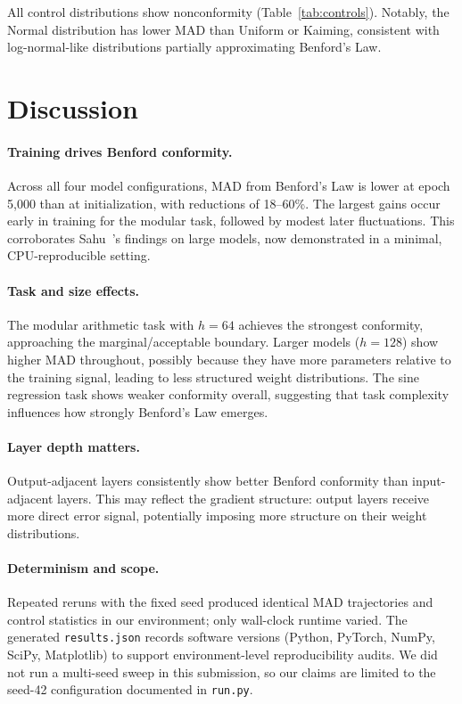 \documentclass[11pt]{article}
\begin{document}
All control distributions show nonconformity (Table~\ref{tab:controls}). Notably, the Normal distribution has lower MAD than Uniform or Kaiming, consistent with log-normal-like distributions partially approximating Benford's Law.

\section{Discussion}

\paragraph{Training drives Benford conformity.}
Across all four model configurations, MAD from Benford's Law is lower at epoch 5{,}000 than at initialization, with reductions of 18--60\%. The largest gains occur early in training for the modular task, followed by modest later fluctuations. This corroborates Sahu~\cite{sahu2021}'s findings on large models, now demonstrated in a minimal, CPU-reproducible setting.

\paragraph{Task and size effects.}
The modular arithmetic task with $h=64$ achieves the strongest conformity, approaching the marginal/acceptable boundary. Larger models ($h=128$) show higher MAD throughout, possibly because they have more parameters relative to the training signal, leading to less structured weight distributions. The sine regression task shows weaker conformity overall, suggesting that task complexity influences how strongly Benford's Law emerges.

\paragraph{Layer depth matters.}
Output-adjacent layers consistently show better Benford conformity than input-adjacent layers. This may reflect the gradient structure: output layers receive more direct error signal, potentially imposing more structure on their weight distributions.

\paragraph{Determinism and scope.}
Repeated reruns with the fixed seed produced identical MAD trajectories and control statistics in our environment; only wall-clock runtime varied. The generated \texttt{results.json} records software versions (Python, PyTorch, NumPy, SciPy, Matplotlib) to support environment-level reproducibility audits. We did not run a multi-seed sweep in this submission, so our claims are limited to the seed-42 configuration documented in \texttt{run.py}.
\end{document}
